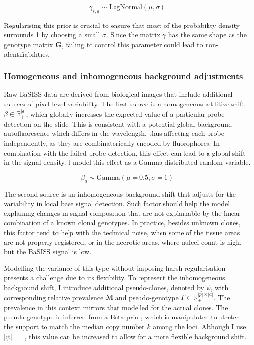 \begin{equation} 
\gamma_{s,a} \sim \text{LogNormal}(\mu, \sigma)
\end{equation}

Regularising this prior is crucial to ensure that most of the probability density surrounds 1 by choosing a small $\sigma$. Since the matrix $\gamma$ has the same shape as the genotype matrix $\mathbf{G}$, failing to control this parameter could lead to non-identifiabilities.

\subsubsection*{Homogeneous and inhomogeneous background adjustments}
\label{sec:background_adjustment}
Raw BaSISS data are derived from biological images that include additional sources of pixel-level variability. The first source is a homogeneous additive shift $\beta \in \mathbb{R}_{+}^{|a|}$, which globally increases the expected value of a particular probe detection on the slide. This is consistent with a potential global background autofluoresence which differs in the wavelength, thus affecting each probe independently, as they are combinatorically encoded by fluorophores. In combination with the failed probe detection, this effect can lead to a global shift in the signal density. I model this effect as a Gamma distributed random variable.

\begin{equation} 
\beta_{a} \sim \text{Gamma}(\mu=0.5, \sigma=1) 
\end{equation}

The second source is an inhomogeneous background shift that adjusts for the variability in local base signal detection. Such factor should help the model explaining changes in signal composition that are not explainable by the linear combination of a known clonal genotypes. In practice, besides unknown clones, this factor tend to help with the technical noise, when some of the tissue areas are not properly registered, or in the necrotic areas, where nulcei count is high, but the \ac{BaSISS} signal is low.

Modelling the variance of this type without imposing harsh regularisation presents a challenge due to its flexibility. To represent the inhomogeneous background shift, I introduce additional pseudo-clones, denoted by $\psi$, with corresponding relative prevalence $\mathbf{M}$ and pseudo-genotype $\Gamma \in \mathbb{R}^{|p|\times|a|}_{+}$. The prevalence in this context mirrors that modelled for the actual clones. The pseudo-genotype is inferred from a Beta prior, which is manipulated to stretch the support to match the median copy number $k$ among the loci. Although I use $|\psi| = 1$, this value can be increased to allow for a more flexible background shift.


